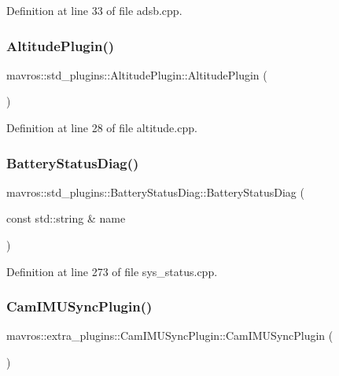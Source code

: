 Definition at line 33 of file adsb.\+cpp.

\mbox{\label{group__plugin_gadbc07fbf84dc0c7445f72271e672e0c6}} 
\subsubsection{\texorpdfstring{AltitudePlugin()}{AltitudePlugin()}}
{\footnotesize\ttfamily mavros\+::std\+\_\+plugins\+::\+Altitude\+Plugin\+::\+Altitude\+Plugin (\begin{DoxyParamCaption}{ }\end{DoxyParamCaption})\hspace{0.3cm}{\ttfamily [inline]}}



Definition at line 28 of file altitude.\+cpp.

\mbox{\label{group__plugin_ga358227b10fadcdf347eed8f7a8dc5019}} 
\subsubsection{\texorpdfstring{BatteryStatusDiag()}{BatteryStatusDiag()}}
{\footnotesize\ttfamily mavros\+::std\+\_\+plugins\+::\+Battery\+Status\+Diag\+::\+Battery\+Status\+Diag (\begin{DoxyParamCaption}\item[{const std\+::string \&}]{name }\end{DoxyParamCaption})\hspace{0.3cm}{\ttfamily [inline]}}



Definition at line 273 of file sys\+\_\+status.\+cpp.

\mbox{\label{group__plugin_gad8c0b7cdde6942c12add29c49e0c3067}} 
\subsubsection{\texorpdfstring{CamIMUSyncPlugin()}{CamIMUSyncPlugin()}}
{\footnotesize\ttfamily mavros\+::extra\+\_\+plugins\+::\+Cam\+I\+M\+U\+Sync\+Plugin\+::\+Cam\+I\+M\+U\+Sync\+Plugin (\begin{DoxyParamCaption}{ }\end{DoxyParamCaption})\hspace{0.3cm}{\ttfamily [inline]}}



